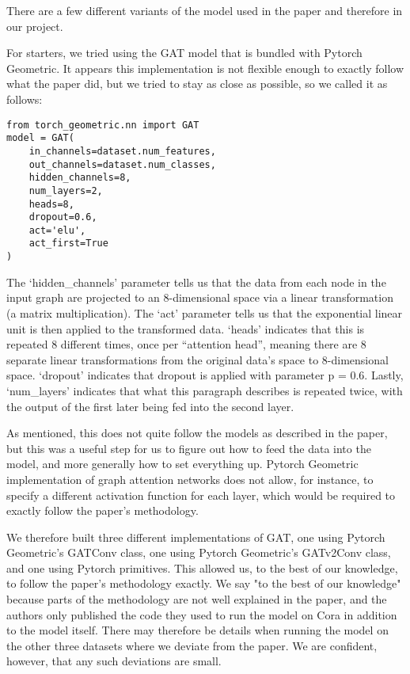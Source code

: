 There are a few different variants of the model used in the paper and
therefore in our project.

For starters, we tried using the GAT model that is bundled with Pytorch
Geometric.
It appears this implementation is not flexible enough to exactly
follow what the paper did, but we tried to stay as close as possible, so we
called it as follows:

\begin{verbatim}
from torch_geometric.nn import GAT
model = GAT(
    in_channels=dataset.num_features,
    out_channels=dataset.num_classes,
    hidden_channels=8,
    num_layers=2,
    heads=8,
    dropout=0.6,
    act='elu',
    act_first=True
)
\end{verbatim}

The `hidden\_channels' parameter tells us that the data from each node in the
input graph are projected to an 8-dimensional space via a linear
transformation (a matrix multiplication).
The `act' parameter tells us that
the exponential linear unit is then applied to the transformed data.
`heads' indicates that this is repeated 8 different times, once per ``attention head'',
meaning there are 8 separate linear transformations from the original data's
space to 8-dimensional space.
`dropout' indicates that dropout is applied with
parameter p = 0.6. Lastly, `num\_layers' indicates that what this paragraph
describes is repeated twice, with the output of the first later being fed into
the second layer.

As mentioned, this does not quite follow the models as described in the paper,
but this was a useful step for us to figure out how to feed the data into the
model, and more generally how to set everything up.
Pytorch Geometric implementation of graph attention networks does not allow, for instance, to
specify a different activation function for each layer, which would be
required to exactly follow the paper's methodology.

We therefore built three different implementations of GAT, one using Pytorch
Geometric's GATConv class, one using Pytorch Geometric's GATv2Conv class, and
one using Pytorch primitives. This allowed us, to the best of our knowledge, to
follow the paper's methodology exactly. We say "to the best of our knowledge"
because parts of the methodology are not well explained in the paper, and the
authors only published the code they used to run the model on Cora in addition
to the model itself. There may therefore be details when running the model on
the other three datasets where we deviate from the paper. We are confident,
however, that any such deviations are small.
